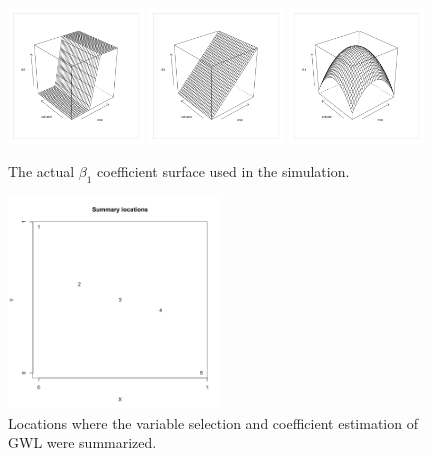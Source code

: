 \documentclass[authoryear, review, 11pt]{elsarticle}
\begin{document}
	\begin{figure}
		\begin{center}
			\includegraphics[width=0.32\textwidth]{../../figures/simulation/step.pdf}
			\includegraphics[width=0.32\textwidth]{../../figures/simulation/gradient.pdf}
			\includegraphics[width=0.32\textwidth]{../../figures/simulation/parabola.pdf}
			\caption{The actual $\beta_1$ coefficient surface used in the simulation.\label{fig:sim-actual}}
		\end{center}
	\end{figure}
	
	\begin{figure}
		\begin{center}
			\includegraphics[width=0.5\textwidth]{../../figures/simulation/summary-locations.pdf}
			\caption{Locations where the variable selection and coefficient estimation of GWL were summarized.\label{fig:summary-locations}}
		\end{center}
	\end{figure}
	
\end{document}
